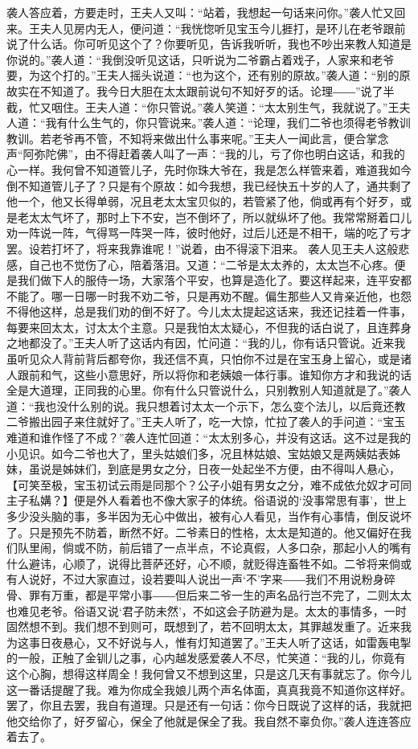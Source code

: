 \documentclass[12pt,oneside]{book}
\begin{document}
袭人答应着，方要走时，王夫人又叫：“站着，我想起一句话来问你。”袭人忙又回来。王夫人见房内无人，便问道：“我恍惚听见宝玉今儿捱打，是环儿在老爷跟前说了什么话。你可听见这个了？你要听见，告诉我听听，我也不吵出来教人知道是你说的。”袭人道：“我倒没听见这话，只听说为二爷霸占着戏子，人家来和老爷要，为这个打的。”王夫人摇头说道：“也为这个，还有别的原故。”袭人道：“别的原故实在不知道了。我今日大胆在太太跟前说句不知好歹的话。论理――”说了半截，忙又咽住。王夫人道：“你只管说。”袭人笑道：“太太别生气，我就说了。”王夫人道：“我有什么生气的，你只管说来。”袭人道：“论理，我们二爷也须得老爷教训教训。若老爷再不管，不知将来做出什么事来呢。”王夫人一闻此言，便合掌念声“阿弥陀佛”，由不得赶着袭人叫了一声：“我的儿，亏了你也明白这话，和我的心一样。我何曾不知道管儿子，先时你珠大爷在，我是怎么样管来着，难道我如今倒不知道管儿子了？只是有个原故：如今我想，我已经快五十岁的人了，通共剩了他一个，他又长得单弱，况且老太太宝贝似的，若管紧了他，倘或再有个好歹，或是老太太气坏了，那时上下不安，岂不倒坏了，所以就纵坏了他。我常常掰着口儿劝一阵说一阵，气得骂一阵哭一阵，彼时他好，过后儿还是不相干，端的吃了亏才罢。设若打坏了，将来我靠谁呢！”说着，由不得滚下泪来。
袭人见王夫人这般悲感，自己也不觉伤了心，陪着落泪。又道：“二爷是太太养的，太太岂不心疼。便是我们做下人的服侍一场，大家落个平安，也算是造化了。要这样起来，连平安都不能了。哪一日哪一时我不劝二爷，只是再劝不醒。偏生那些人又肯亲近他，也怨不得他这样，总是我们劝的倒不好了。今儿太太提起这话来，我还记挂着一件事，每要来回太太，讨太太个主意。只是我怕太太疑心，不但我的话白说了，且连葬身之地都没了。”王夫人听了这话内有因，忙问道：“我的儿，你有话只管说。近来我虽听见众人背前背后都夸你，我还信不真，只怕你不过是在宝玉身上留心，或是诸人跟前和气，这些小意思好，所以将你和老姨娘一体行事。谁知你方才和我说的话全是大道理，正同我的心里。你有什么只管说什么，只别教别人知道就是了。”袭人道：“我也没什么别的说。我只想着讨太太一个示下，怎么变个法儿，以后竟还教二爷搬出园子来住就好了。”王夫人听了，吃一大惊，忙拉了袭人的手问道：“宝玉难道和谁作怪了不成？”袭人连忙回道：“太太别多心，并没有这话。这不过是我的小见识。如今二爷也大了，里头姑娘们多，况且林姑娘、宝姑娘又是两姨姑表姊妹，虽说是姊妹们，到底是男女之分，日夜一处起坐不方便，由不得叫人悬心，【可笑至极，宝玉初试云雨是同那个？公子小姐有男女之分，难不成依允奴才可同主子私媾？】便是外人看着也不像大家子的体统。俗语说的‘没事常思有事’，世上多少没头脑的事，多半因为无心中做出，被有心人看见，当作有心事情，倒反说坏了。只是预先不防着，断然不好。二爷素日的性格，太太是知道的。他又偏好在我们队里闹，倘或不防，前后错了一点半点，不论真假，人多口杂，那起小人的嘴有什么避讳，心顺了，说得比菩萨还好，心不顺，就贬得连畜牲不如。二爷将来倘或有人说好，不过大家直过，设若要叫人说出一声‘不’字来――我们不用说粉身碎骨、罪有万重，都是平常小事――但后来二爷一生的声名品行岂不完了，二则太太也难见老爷。俗语又说‘君子防未然’，不如这会子防避为是。太太的事情多，一时固然想不到。我们想不到则可，既想到了，若不回明太太，其罪越发重了。近来我为这事日夜悬心，又不好说与人，惟有灯知道罢了。”王夫人听了这话，如雷轰电掣的一般，正触了金钏儿之事，心内越发感爱袭人不尽，忙笑道：“我的儿，你竟有这个心胸，想得这样周全！我何曾又不想到这里，只是这几天有事就忘了。你今儿这一番话提醒了我。难为你成全我娘儿两个声名体面，真真我竟不知道你这样好。罢了，你且去罢，我自有道理。只是还有一句话：你今日既说了这样的话，我就把他交给你了，好歹留心，保全了他就是保全了我。我自然不辜负你。”袭人连连答应着去了。
\end{document}
